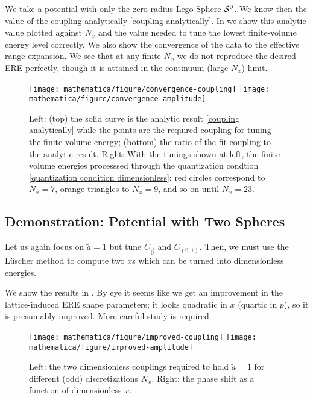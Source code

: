 We take a potential with only the zero-radius Lego Sphere $\mathcal{S}^{0}$.
We know then the value of the coupling analytically \eqref{coupling analytically}.
In  we show this analytic value plotted against $N_x$ and the value needed to tune the lowest finite-volume energy level correctly.
We also show the convergence of the data to the effective range expansion.
We see that at any finite $N_x$ we do not reproduce the desired ERE perfectly, though it is attained in the continuum (large-$N_x$) limit.

\begin{figure}
	\texttt{[image: mathematica/figure/convergence-coupling]}
	\texttt{[image: mathematica/figure/convergence-amplitude]}
	\caption{
		Left:
			(top) the solid curve is the analytic result \eqref{coupling analytically} while the points are the required coupling for tuning the finite-volume energy;
			(bottom) the ratio of the fit coupling to the analytic result.
		Right:
			With the tunings shown at left, the finite-volume energies processsed through the quantization condtion \eqref{quantization condition dimensionless}; red circles correspond to $N_x=7$, orange triangles to $N_x=9$, and so on until $N_x=23$.
	}
	\label{fig:convergence contact}
\end{figure}

\subsection{Demonstration: Potential with Two Spheres}

Let us again focus on $\tilde{a} = 1$ but tune $C_{\vec{0}}$ and $C_{(0,1)}$.
Then, we must use the L\"{u}scher method to compute two $x$s which can be turned into dimensionless energies.

We show the results in .
By eye it seems like we get an improvement in the lattice-induced ERE shape parameters; it looks quadratic in $x$ (quartic in $p$), so it is presumably improved.
More careful study is required.

\begin{figure}
	\texttt{[image: mathematica/figure/improved-coupling]}
	\texttt{[image: mathematica/figure/improved-amplitude]}
	\caption{
		Left: the two dimensionless couplings required to hold $\tilde{a}=1$ for different (odd) discretizations $N_x$.
		Right: the phase shift as a function of dimensionless $x$.
	}
    \label{fig:tune two spheres}
\end{figure}


